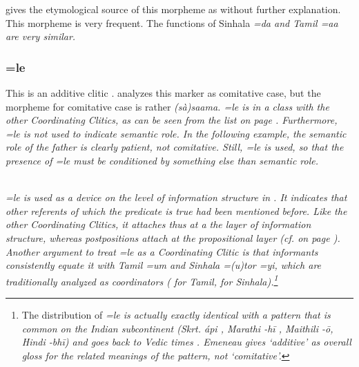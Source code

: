 \citet{Bakker2006} gives the etymological source of this morpheme as  without further explanation. 
This morpheme is very frequent. The functions of Sinhala \em =da \em and Tamil \em =aa \em are very similar.

  

% 




\subsubsection{=le}\label{sec:morph:=le}
This is an additive clitic \citet[cf.][168]{SmithEtAl2007}.
\citet {Ansaldo2005ms,Ansaldo2008genesis,Ansaldo2009}  analyzes this marker as comitative case, but the morpheme for comitative case is rather \em (sà)saama\em {}. \em =le \em is in a class with the other Coordinating Clitics, as can be seen from the list on page  \pageref{page:list:morph:clt}. Furthermore, \em =le \em is not used to indicate semantic role. In the following example, the semantic role of the father is clearly patient, not comitative. Still, \em =le \em is used, so that the presence of \em =le \em must be conditioned by something else than semantic role.

 
\\

\em =le \em is used as a device on the level of information structure in .  It indicates that other referents of which the predicate  is true had been mentioned before. Like the other Coordinating Clitics, it attaches thus at a the layer of information structure, whereas postpositions attach at the propositional layer (cf.  on page \pageref{ex:form:boundwords:stacking}). Another argument to treat \em =le \em as a Coordinating Clitic is that informants consistently equate it with Tamil \em =um \em and Sinhala \em =(u)t\em or \em =yi\em, which are traditionally analyzed as coordinators  (\citet[151]{Lehmann1989} for Tamil, \citet[26]{Karunatillake2004} for Sinhala).\footnote{The distribution of \em =le \em is actually exactly identical with a pattern that is common on the Indian subcontinent (Skrt. \em ápi \em, Marathi \em -h\=i \em, Maithili \em -\=o\em, Hindi \em -bh\=i\em) and goes back to Vedic times \citep{Emeneau1974}. Emeneau gives `additive' as overall gloss for the related meanings of the pattern, not `comitative'.}


